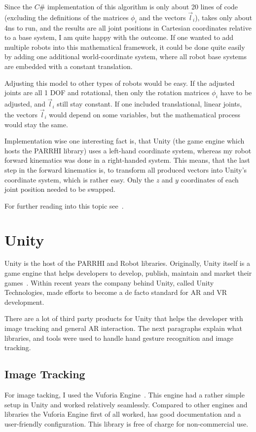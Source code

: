 \FloatBarrier

Since the $C\#$ implementation of this algorithm is only about 20 lines of code (excluding the definitions of the matrices $\phi_i$ and the vectors $\vec{l}_i$), takes only about 4ns to run, and the results are all joint positions in Cartesian coordinates relative to a base system, I am quite happy with the outcome. If one wanted to add multiple robots into this mathematical framework, it could be done quite easily by adding one additional world-coordinate system, where all robot base systems are embedded with a constant translation.
	
Adjusting this model to other types of robots would be easy. If the adjusted joints are all 1 DOF and rotational, then only the rotation matrices $\phi_i$ have to be adjusted, and $\vec{l}_i$ still stay constant. If one included translational, linear joints, the vectors $\vec{l}_i$ would depend on some variables, but the mathematical process would stay the same.

Implementation wise one interesting fact is, that Unity (the game engine which hosts the PARRHI library) uses a left-hand coordinate system, whereas my robot forward kinematics was done in a right-handed system. This means, that the last step in the forward kinematics is, to transform all produced vectors into Unity's coordinate system, which is rather easy. Only the $z$ and $y$ coordinates of each joint position needed to be swapped.

For further reading into this topic see~\cite{murray2017mathematical}.
	
\section{Unity}
Unity is the host of the PARRHI and Robot libraries. Originally, Unity itself is a game engine that helps developers to develop, publish, maintain and market their games~\cite{Unity}. Within recent years the company behind Unity, called Unity Technologies, made efforts to become a de facto standard for AR and VR development.

There are a lot of third party products for Unity that helps the developer with image tracking and general AR interaction. The next paragraphs explain what libraries, and tools were used to handle hand gesture recognition and image tracking.

\subsection{Image Tracking}\label{Section:ImageTracking}
For image tacking, I used the Vuforia Engine~\cite{Vuforia}. This engine had a rather simple setup in Unity and worked relatively seamlessly. Compared to other engines and libraries the Vuforia Engine first of all worked, has good documentation and a user-friendly configuration. This library is free of charge for non-commercial use.

